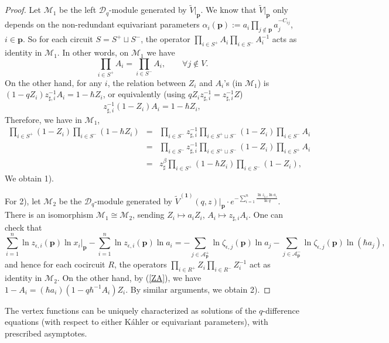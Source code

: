 \documentclass[10pt]{amsart}
\theoremstyle{definition}
\def\ben{\begin{eqnarray*}}
\def\een{\end{eqnarray*}}
\newcommand{\bp}{\mathbf{p}}
\newcommand{\bone}{\mathbf{1}}
\newcommand{\cA}{\mathcal{A}}
\newcommand{\cD}{\mathcal{D}}
\newcommand{\cM}{\mathcal{M}}
\theoremstyle{definition}
\numberwithin{equation}{section}
\theoremstyle{Theorem}
\begin{document}
\begin{proof}
Let $\cM_1$ be the left $\cD_q$-module generated by $\widetilde V \big|_\bp$. We know that $\widetilde V \big|_\bp$ only depends on the non-redundant equivariant parameters $\alpha_i (\bp) := a_i \prod_{j\not\in \bp} a_j^{-C_{ij}}$, $i\in \bp$. So for each circuit $S = S^+ \sqcup S^-$, the operator $\prod_{i\in S^+} A_i \prod_{i\in S^-} A_i^{-1}$ acts as identity in $\cM_1$. In other words, on $\cM_1$ we have
$$
\prod_{i\in S^+} A_i  = \prod_{i\in S^-} A_i , \qquad \forall j\not\in V.
$$
On the other hand, for any $i$, the relation between $Z_i$ and $A_i$'s (in $\cM_1$) is $( 1 - q Z_i ) z_{\sharp, i}^{-1} A_i  =  1 - \hbar Z_i$, or equivalently (using $q Z_i z_{\sharp, i}^{-1} = z_{\sharp, i}^{-1} Z$)
\begin{equation} \label{ZA}
z_{\sharp, i}^{-1} (1 - Z_i) A_i  =  1 - \hbar Z_i  ,
\end{equation}
Therefore, we have in $\cM_1$,
\ben
 \prod_{i\in S^+} ( 1 - Z_i ) \prod_{i\in S^-} ( 1 - \hbar Z_i )
&=&  \prod_{i\in S^-} z_{\sharp, i}^{-1}  \prod_{i\in S^+ \sqcup S^-} ( 1 - Z_i )  \prod_{i\in S^-} A_i   \\
&=& \prod_{i\in S^-} z_{\sharp ,i}^{-1} \prod_{i\in S^+ \sqcup S^-} ( 1 - Z_i )   \prod_{i\in S^+} A_i   \\
&=& z_\sharp^\beta \prod_{i\in S^+} ( 1 - \hbar  Z_i )  \prod_{i\in S^-} ( 1 - Z_i )  ,
\een
We obtain 1).

For 2), let $\cM_2$ be the $\cD_q$-module generated by $\widetilde V^{(\bone)} (q,z) \big|_\bp \cdot e^{-\sum_{i=1}^n \frac{\ln z_{\sharp, i} \ln a_i}{\ln q} }$. There is an isomorphism $\cM_1 \cong \cM_2$, sending $Z_i \mapsto a_i Z_i$, $A_i \mapsto z_{\sharp, i} A_i$.   One can check that  
$$
\sum_{i=1}^n \ln z_{\epsilon, i} (\bp) \ln x_i |_\bp - \sum_{i=1}^n \ln z_{\epsilon, i} (\bp) \ln a_i  = -\sum_{j\in \cA_\bp^+ } \ln \zeta_{\epsilon, j} (\bp) \ln a_j - \sum_{j\in \cA_\bp^- } \ln \zeta_{\epsilon, j} (\bp) \ln (\hbar a_j), 
$$ 
and hence for each cocircuit $R$, the operators $\prod_{i\in R^+} Z_i \prod_{i\in R^-} Z_i^{-1}$ act as identity in $\cM_2$. On the other hand, by (\ref{ZA}), we have $1- A_i = (\hbar a_i) (1 - q\hbar^{-1} A_i ) Z_i$. By similar arguments, we obtain 2).
\end{proof}

The vertex functions can be uniquely characterized as solutions of the  $q$-difference equations (with respect to either K\'ahler or equivariant parameters), with prescribed asymptotes.
\end{document}
